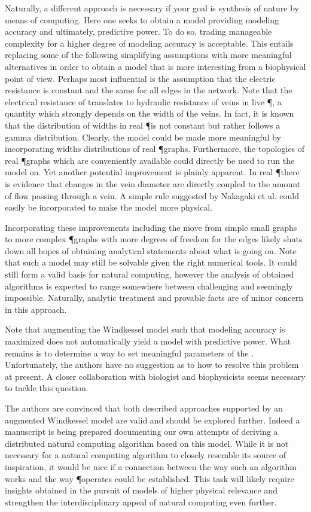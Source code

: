 	Naturally, a different approach is necessary if your goal is synthesis of nature by means of computing. Here one seeks to obtain a model providing modeling accuracy and ultimately, predictive power. To do so, trading manageable complexity for a higher degree of modeling accuracy is acceptable. This entails replacing some of the following simplifying assumptions with more meaningful alternatives in order to obtain a model that is more interesting from a biophysical point of view. Perhaps most influential is the assumption that the electric resistance is constant and the same for all edges in the network. Note that the electrical resistance of \Pes translates to hydraulic resistance of veins in live \P, a quantity which strongly depends on the width of the veins. In fact, it is known that the distribution of widths in real \P is not constant but rather follows a gamma distribution. Clearly, the model could be made more meaningful by incorporating widths distributions of real \P graphs. Furthermore, the topologies of real \P graphs which are conveniently available could directly be used to run the model on. Yet another potential improvement is plainly apparent. In real \P there is evidence that changes in the vein diameter are directly coupled to the amount of flow passing through a vein. A simple rule suggested by Nakagaki et al. could easily be incorporated to make the model more physical.

	Incorporating these improvements including the move from simple small graphs to more complex \P graphs with more degrees of freedom for the edges likely shuts down all hopes of obtaining analytical statements about what is going on. Note that such a model may still be solvable given the right numerical tools. It could still form a valid basis for natural computing, however the analysis of obtained algorithms is expected to range somewhere between challenging and seemingly impossible. Naturally, analytic treatment and provable facts are of minor concern in this approach.

	Note that augmenting the Windkessel model such that modeling accuracy is maximized does not automatically yield a model with predictive power. What remains is to determine a way to set meaningful parameters of the \Pes. Unfortunately, the authors have no suggestion as to how to resolve this problem at present. A closer collaboration with biologist and biophysicists seems necessary to tackle this question.

	The authors are convinced that both described approaches supported by an augmented Windkessel model are valid and should be explored further. Indeed a manuscript is being prepared documenting our own attempts of deriving a distributed natural computing algorithm based on this model. While it is not necessary for a natural computing algorithm to closely resemble its source of inspiration, it would be nice if a connection between the way such an algorithm works and the way \P operates could be established. This task will likely require insights obtained in the pursuit of models of higher physical relevance and strengthen the interdisciplinary appeal of natural computing even further.
